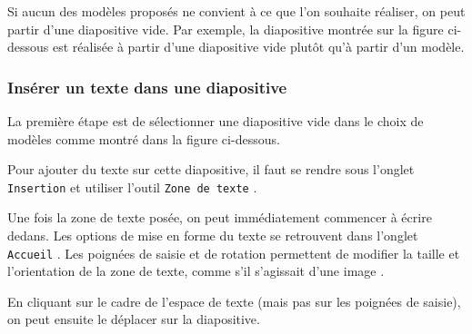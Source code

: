 Si aucun des modèles proposés ne convient à ce que l'on souhaite réaliser, on peut partir d'une diapositive vide. Par exemple, la diapositive montrée sur la figure ci-dessous est réalisée à partir d'une diapositive vide plutôt qu'à partir d'un modèle.



\subsubsection{Insérer un texte dans une diapositive}\label{Presentation1texte}


\vspace{1em}

La première étape est de sélectionner une diapositive vide dans le choix de modèles comme montré dans la figure ci-dessous.




Pour ajouter du texte sur cette diapositive, il faut se rendre sous l'onglet \texttt{Insertion}  et utiliser l'outil \texttt{Zone de texte} .


Une fois la zone de texte posée, on peut immédiatement commencer à écrire dedans. Les options de mise en forme du texte se retrouvent dans l'onglet \texttt{Accueil} . Les poignées de saisie et de rotation permettent de modifier la taille et l'orientation de la zone de texte, comme s'il s'agissait d'une image .


\vspace{1em}

En cliquant sur le cadre de l'espace de texte (mais pas sur les poignées de saisie), on peut ensuite le déplacer sur la diapositive. 

